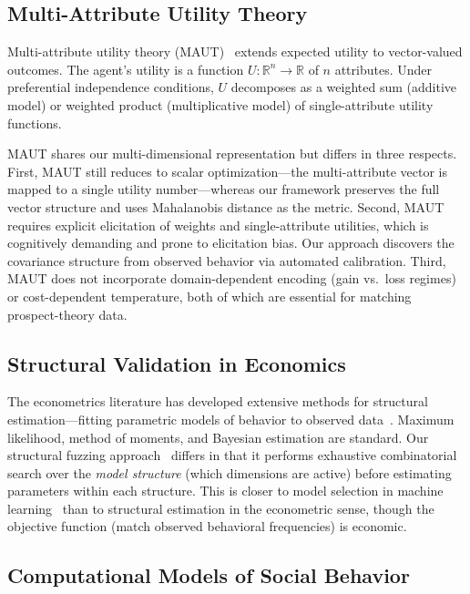 \documentclass[journal]{IEEEtran}
\begin{document}
\subsection{Multi-Attribute Utility Theory}

Multi-attribute utility theory (MAUT)~\cite{keeney1993} extends expected utility to vector-valued outcomes.
The agent's utility is a function $U: \mathbb{R}^n \to \mathbb{R}$ of $n$ attributes.
Under preferential independence conditions, $U$ decomposes as a weighted sum (additive model) or weighted product (multiplicative model) of single-attribute utility functions.

MAUT shares our multi-dimensional representation but differs in three respects.
First, MAUT still reduces to scalar optimization---the multi-attribute vector is mapped to a single utility number---whereas our framework preserves the full vector structure and uses Mahalanobis distance as the metric.
Second, MAUT requires explicit elicitation of weights and single-attribute utilities, which is cognitively demanding and prone to elicitation bias.
Our approach discovers the covariance structure from observed behavior via automated calibration.
Third, MAUT does not incorporate domain-dependent encoding (gain vs.\ loss regimes) or cost-dependent temperature, both of which are essential for matching prospect-theory data.

\subsection{Structural Validation in Economics}

The econometrics literature has developed extensive methods for structural estimation---fitting parametric models of behavior to observed data~\cite{train2009}.
Maximum likelihood, method of moments, and Bayesian estimation are standard.
Our structural fuzzing approach~\cite{bond2026fuzz} differs in that it performs exhaustive combinatorial search over the \emph{model structure} (which dimensions are active) before estimating parameters within each structure.
This is closer to model selection in machine learning~\cite{hastie2009} than to structural estimation in the econometric sense, though the objective function (match observed behavioral frequencies) is economic.

\subsection{Computational Models of Social Behavior}
\end{document}
